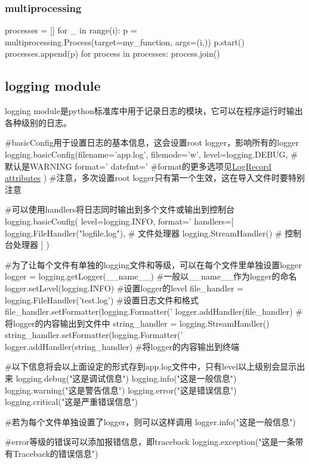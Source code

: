     \subsubsection{multiprocessing}
      \begin{codeblock}[language=python, caption={multiprocessing module}]
        processes = []
        for _ in range(i):
            p = multiprocessing.Process(target=my_function, args=(i,))
            p.start()
            processes.append(p)
        for process in processes:
            process.join()
      \end{codeblock}

  \subsection{logging module}
    logging module是python标准库中用于记录日志的模块，它可以在程序运行时输出各种级别的日志。
    \begin{codeblock}[language=python, caption={logging module}]
      #basicConfig用于设置日志的基本信息，这会设置root logger，影响所有的logger
      logging.basicConfig(filename='app.log', filemode='w', 
                  level=logging.DEBUG, #默认是WARNING
                  format='%
                  datefmt='%
                      #format的更多选项见\href{https://docs.python.org/3/library/logging.html#logrecord-attributes}{\underline{LogRecord attributes}}
                  )
      #注意，多次设置root logger只有第一个生效，这在导入文件时要特别注意

      #可以使用handlers将日志同时输出到多个文件或输出到控制台
      logging.basicConfig(
          level=logging.INFO,
          format='%
          handlers=[
              logging.FileHandler("logfile.log"),   # 文件处理器
              logging.StreamHandler()               # 控制台处理器
          ]
      )

      #为了让每个文件有单独的logging文件和等级，可以在每个文件里单独设置logger
      logger = logging.getLogger(__name__) #一般以\_\_name\_\_作为logger的命名
      logger.setLevel(logging.INFO) #设置logger的level
      file_handler = logging.FileHandler('test.log') #设置日志文件和格式
      file_handler.setFormatter(logging.Formatter('%
      logger.addHandler(file_handler) #将logger的内容输出到文件中
      string_handler = logging.StreamHandler()
      string_handler.setFormatter(logging.Formatter('%
      logger.addHandler(string_handler) #将logger的内容输出到终端

      #以下信息将会以上面设定的形式存到app.log文件中，只有level以上级别会显示出来
      logging.debug("这是调试信息")
      logging.info("这是一般信息")
      logging.warning("这是警告信息")
      logging.error("这是错误信息")
      logging.critical("这是严重错误信息")

      #若为每个文件单独设置了logger，则可以这样调用
      logger.info("这是一般信息")

      #error等级的错误可以添加报错信息，即traceback
      logging.exception("这是一条带有Traceback的错误信息")
    \end{codeblock}

